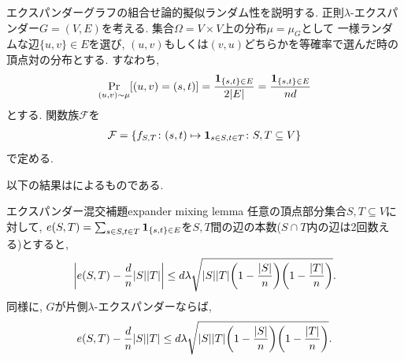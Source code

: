 エクスパンダーグラフの組合せ論的擬似ランダム性を説明する.
正則$\lambda$-エクスパンダー$G=(V,E)$を考える.
集合$\Omega=V\times V$上の分布$\mu = \mu_G$として
一様ランダムな辺$\{u,v\}\in E$を選び, $(u,v)$もしくは$(v,u)$どちらかを等確率で選んだ時の頂点対の分布とする.
すなわち,
\begin{align}
    \Pr_{(u,v)\sim \mu}\sbra*{ (u,v) = (s,t)} = \frac{\indicator{\{s,t\}\in E}}{2\abs{E}} = \frac{\indicator{\{s,t\}\in E}}{nd} \label{eq:expander mu}
\end{align}
とする.
関数族$\mathcal{F}$を
\begin{align}
    \mathcal{F} = \cbra*{ f_{S,T} \colon (s,t) \mapsto \indicator{s\in S,t\in T} \colon S,T\subseteq V}  \label{eq:expander F}
\end{align}
で定める.

以下の結果は\citet{AC88}によるものである.
%
\begin{lemma}{エクスパンダー混交補題}{expander mixing lemma}
    任意の頂点部分集合$S,T\subseteq V$に対して,
    $e(S,T) = \sum_{s\in S,t\in T} \indicator{\{s,t\} \in E}$を$S,T$間の辺の本数($S\cap T$内の辺は2回数える)とすると,
    \[
        \abs*{e(S,T) - \frac{d}{n}|S||T|} \le d\lambda\sqrt{|S||T|\rbra*{1-\frac{|S|}{n}}\rbra*{1-\frac{|T|}{n}}}.
    \]
    同様に, $G$が片側$\lambda$-エクスパンダーならば,
    \[
        e(S,T) - \frac{d}{n}|S||T| \le d\lambda\sqrt{|S||T|\rbra*{1-\frac{|S|}{n}}\rbra*{1-\frac{|T|}{n}}}.
    \]
\end{lemma}

